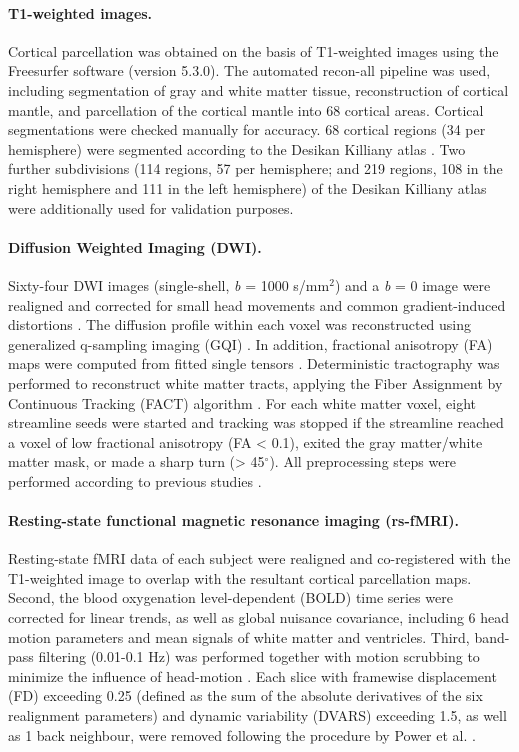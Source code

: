 \begin{refsection}
\paragraph{T1-weighted images.}
Cortical parcellation was obtained on the basis of T1-weighted images using the Freesurfer software (version 5.3.0). The automated recon-all pipeline was used, including segmentation of gray and white matter tissue, reconstruction of cortical mantle, and parcellation of the cortical mantle into 68 cortical areas. Cortical segmentations were checked manually for accuracy. 68 cortical regions (34 per hemisphere) were segmented according to the Desikan Killiany atlas \citep{DESIKAN2006968}. Two further subdivisions \citep{CAMMOUN2012386} (114 regions, 57 per hemisphere; and 219 regions, 108 in the right hemisphere and 111 in the left hemisphere) of the Desikan Killiany atlas were additionally used for validation purposes.

\paragraph{Diffusion Weighted Imaging (DWI).}
Sixty-four DWI images (single-shell, \textit{b} = 1000 s/mm$^{2}$) and a \textit{b} = 0 image were realigned and corrected for small head movements and common gradient-induced distortions \citep{ANDERSSON2002177}. The diffusion profile within each voxel was reconstructed using generalized q-sampling imaging (GQI) \citep{YEH2010}. In addition, fractional anisotropy (FA) maps were computed from fitted single tensors \citep{Chang2005RESTORERE}. Deterministic tractography was performed to reconstruct white matter tracts, applying the Fiber Assignment by Continuous Tracking (FACT) algorithm \citep{Mori2002FiberTP}. For each white matter voxel, eight streamline seeds were started and tracking was stopped if the streamline reached a voxel of low fractional anisotropy (FA < 0.1), exited the gray matter/white matter mask, or made a sharp turn (> 45$^{\circ}$). All preprocessing steps were performed according to previous studies \citep{VANDENHEUVEL2016293,Romme2017ConnectomeDA}.

\paragraph{Resting-state functional magnetic resonance imaging (rs-fMRI).}
Resting-state fMRI data of each subject were realigned and co-registered with the T1-weighted image to overlap with the resultant cortical parcellation maps. Second, the blood oxygenation level-dependent (BOLD) time series were corrected for linear trends, as well as global nuisance covariance, including 6 head motion parameters and mean signals of white matter and ventricles. Third, band-pass filtering (0.01-0.1 Hz) was performed together with motion scrubbing to minimize the influence of head-motion \citep{Power2012SpuriousBS}. Each slice with framewise displacement (FD) exceeding 0.25 (defined as the sum of the absolute derivatives of the six realignment parameters) and dynamic variability (DVARS) exceeding 1.5, as well as 1 back neighbour, were removed following the procedure by Power et al. \citep{Power2012SpuriousBS}.


\end{refsection}
